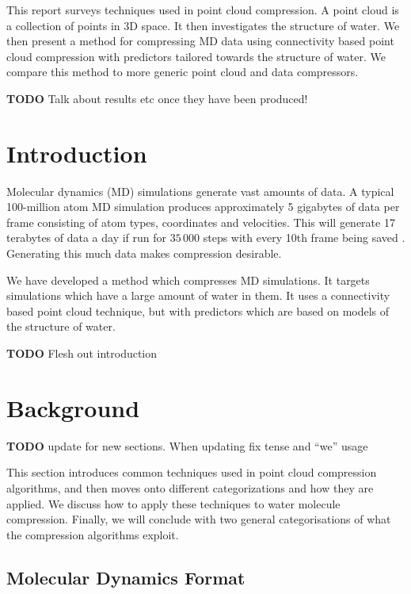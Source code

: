 \documentclass{report}
\newcommand{\todo}{\textbf{TODO} }
\begin{document}
This report surveys techniques used in point cloud compression. A point cloud
is a collection of points in 3D space. It then investigates the structure of
water. We then present a method for compressing MD data using connectivity
based point cloud compression with predictors tailored towards the structure
of water. We compare this method to more generic point cloud and data
compressors.

\todo Talk about results etc once they have been produced!

\tableofcontents

\chapter{Introduction}

Molecular dynamics (MD) simulations generate vast amounts of data. A typical
100-million atom MD simulation produces approximately 5 gigabytes of data per
frame consisting of atom types, coordinates and velocities. This will generate
17 terabytes of data a day if run for $35\,000$ steps with every 10th frame
being saved \citep{omeltchenko2000sls}. Generating this much data makes
compression desirable.

We have developed a method which compresses MD simulations. It targets
simulations which have a large amount of water in them. It uses a connectivity
based point cloud technique, but with predictors which are based on models of
the structure of water.

\todo Flesh out introduction

\chapter{Background}


\todo update for new sections. When updating fix tense and ``we'' usage

This section introduces common techniques used in point cloud compression
algorithms, and then moves onto different categorizations and how they are
applied. We discuss how to apply these techniques to water molecule
compression. Finally, we will conclude with two general categorisations of
what the compression algorithms exploit.

\section{Molecular Dynamics Format}
\end{document}
